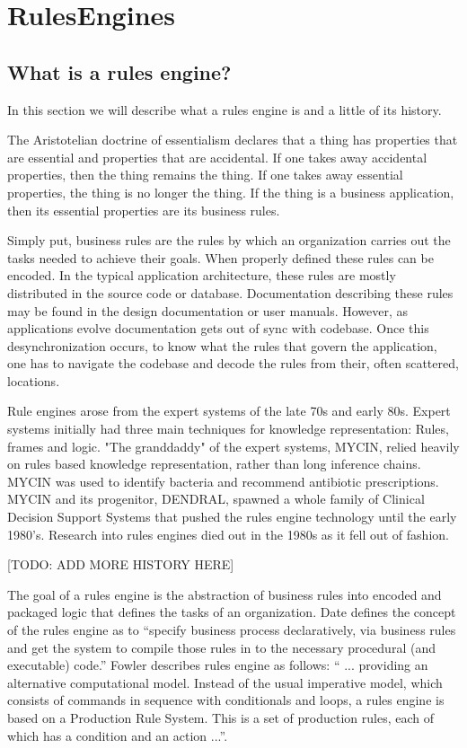 \section{RulesEngines}

\subsection{What is a rules engine?}

In this section we will describe what a rules engine is and a little of its history.

The Aristotelian doctrine of essentialism declares that a thing has properties that are essential and properties that are accidental.
If one takes away accidental properties, then the thing remains the thing.
If one takes away essential properties, the thing is no longer the thing.
If the thing is a business application, then its essential properties are its business rules.


Simply put, business rules are the rules by which an organization carries out the tasks needed to achieve their goals.
When properly defined these rules can be encoded.
In the typical application architecture, these rules are mostly distributed in the source code or database.
Documentation describing these rules may be found in the design documentation or user manuals.
However, as applications evolve documentation gets out of sync with codebase.
Once this desynchronization occurs, to know what the rules that govern the application, one has to navigate the codebase and decode the rules from their, often scattered, locations.


Rule engines arose from the expert systems of the late 70s and early 80s. 
Expert systems initially had three main techniques for knowledge representation: Rules, frames and logic\cite{jackson1986introduction}.  
"The granddaddy" of the expert systems, MYCIN, relied heavily on rules based knowledge representation\cite{shortliffe1974mycin}, rather than long inference chains.
MYCIN was used to identify bacteria and recommend antibiotic prescriptions.
MYCIN and its progenitor, DENDRAL, spawned a whole family of Clinical Decision Support Systems that pushed the rules engine technology until the early 1980's.
Research into rules engines died out in the 1980s as it fell out of fashion.


[TODO: ADD MORE HISTORY HERE]


The goal of a rules engine is the abstraction of business rules into encoded and packaged logic that defines the tasks of an organization.
Date\cite{date2000not} defines the concept of the rules engine as to ``specify business process declaratively, via business rules and get the system to compile those rules in to the necessary procedural (and executable) code.''
Fowler\cite{Fowler_rulesEngine} describes rules engine as follows: `` ... providing an alternative computational model.
Instead of the usual imperative model, which consists of commands in sequence with conditionals and loops, a rules engine is based on a Production Rule System.
This is a set of production rules, each of which has a condition and an action ...''.

